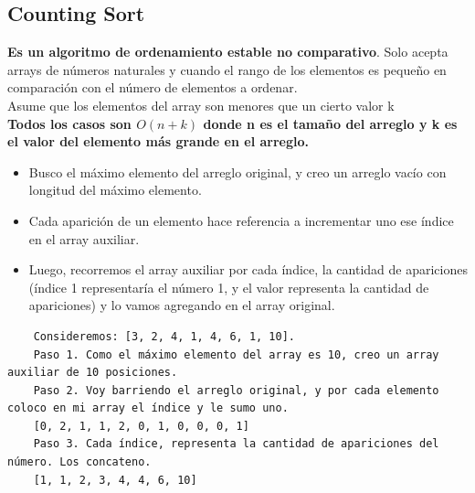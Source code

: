\documentclass[10pt,a4paper]{article}
\begin{document}
\subsection*{Counting Sort}
\textbf{Es un algoritmo de ordenamiento estable no comparativo}. Solo acepta arrays de números naturales y cuando el rango de los elementos es pequeño en comparación con el número de elementos a ordenar. \\
Asume que los elementos del array son menores que un cierto valor k \\
\textbf{Todos los casos son $O(n+k)$ donde n es el tamaño del arreglo y k es el valor del elemento más grande en el arreglo.}
\begin{itemize}
    \item Busco el máximo elemento del arreglo original, y creo un arreglo vacío con longitud del máximo elemento.
    \item Cada aparición de un elemento hace referencia a incrementar uno ese índice en el array auxiliar.
    \item Luego, recorremos el array auxiliar por cada índice, la cantidad de apariciones (índice 1 representaría el número 1, y el valor representa la cantidad de apariciones) y lo vamos agregando en el array original.
\end{itemize}
\begin{lstlisting}
    Consideremos: [3, 2, 4, 1, 4, 6, 1, 10].
    Paso 1. Como el máximo elemento del array es 10, creo un array auxiliar de 10 posiciones.
    Paso 2. Voy barriendo el arreglo original, y por cada elemento coloco en mi array el índice y le sumo uno.
    [0, 2, 1, 1, 2, 0, 1, 0, 0, 0, 1]
    Paso 3. Cada índice, representa la cantidad de apariciones del número. Los concateno.
    [1, 1, 2, 3, 4, 4, 6, 10]
\end{lstlisting}
\end{document}
